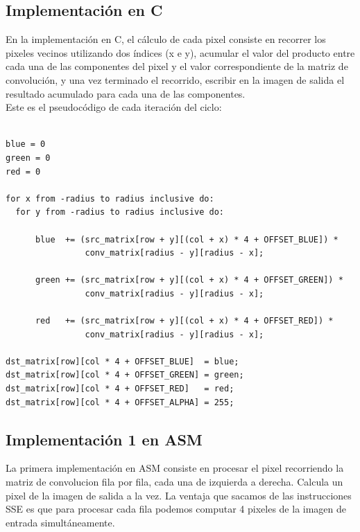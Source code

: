 \documentclass[10pt,a4paper,spanish]{article}
\begin{document}
\subsection{Implementación en C}

En la implementación en C, el cálculo de cada pixel consiste en recorrer los pixeles vecinos utilizando dos índices (x e y), acumular el valor del producto entre cada una de las componentes del pixel y el valor correspondiente de la matriz de convolución, y una vez terminado el recorrido, escribir en la imagen de salida el resultado acumulado para cada una de las componentes. \\

Este es el pseudocódigo de cada iteración del ciclo:

\begin{codesnippet}
\begin{verbatim}

blue = 0
green = 0
red = 0

for x from -radius to radius inclusive do:
  for y from -radius to radius inclusive do:

      blue  += (src_matrix[row + y][(col + x) * 4 + OFFSET_BLUE]) *
                conv_matrix[radius - y][radius - x];

      green += (src_matrix[row + y][(col + x) * 4 + OFFSET_GREEN]) *
                conv_matrix[radius - y][radius - x];

      red   += (src_matrix[row + y][(col + x) * 4 + OFFSET_RED]) *
                conv_matrix[radius - y][radius - x];

dst_matrix[row][col * 4 + OFFSET_BLUE]  = blue;
dst_matrix[row][col * 4 + OFFSET_GREEN] = green;
dst_matrix[row][col * 4 + OFFSET_RED]   = red;
dst_matrix[row][col * 4 + OFFSET_ALPHA] = 255;

\end{verbatim}
\end{codesnippet}

\subsection{Implementación 1 en ASM}

La primera implementación en ASM consiste en procesar el pixel recorriendo la matriz de convolucion fila por fila, cada una de izquierda a derecha.
Calcula un pixel de la imagen de salida a la vez. La ventaja que sacamos de las instrucciones SSE es que para procesar cada fila podemos computar 4 pixeles de la imagen de entrada simultáneamente. \\
\end{document}
